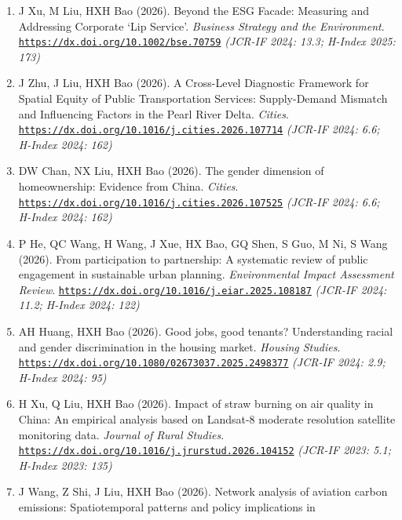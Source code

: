 \documentclass[10pt,a4paper]{article}
\providecommand{\tightlist}{%
  \setlength{\itemsep}{2pt}\setlength{\parskip}{0pt}}
\begin{document}
\begin{enumerate}
\def\labelenumi{\arabic{enumi}.}
\tightlist
\item
  J Xu, M Liu, HXH Bao (2026). Beyond the ESG Facade: Measuring and
  Addressing Corporate `Lip Service'. \emph{Business Strategy and the
  Environment}.
  \href{https://dx.doi.org/10.1002/bse.70759}{\nolinkurl{https://dx.doi.org/10.1002/bse.70759}}
  \emph{(JCR-IF 2024: 13.3; H-Index 2025: 173)}
\item
  J Zhu, J Liu, HXH Bao (2026). A Cross-Level Diagnostic Framework for
  Spatial Equity of Public Transportation Services: Supply-Demand
  Mismatch and Influencing Factors in the Pearl River Delta.
  \emph{Cities}.
  \href{https://dx.doi.org/10.1016/j.cities.2026.107714}{\nolinkurl{https://dx.doi.org/10.1016/j.cities.2026.107714}}
  \emph{(JCR-IF 2024: 6.6; H-Index 2024: 162)}
\item
  DW Chan, NX Liu, HXH Bao (2026). The gender dimension of
  homeownership: Evidence from China. \emph{Cities}.
  \href{https://dx.doi.org/10.1016/j.cities.2026.107525}{\nolinkurl{https://dx.doi.org/10.1016/j.cities.2026.107525}}
  \emph{(JCR-IF 2024: 6.6; H-Index 2024: 162)}
\item
  P He, QC Wang, H Wang, J Xue, HX Bao, GQ Shen, S Guo, M Ni, S Wang
  (2026). From participation to partnership: A systematic review of
  public engagement in sustainable urban planning. \emph{Environmental
  Impact Assessment Review}.
  \href{https://dx.doi.org/10.1016/j.eiar.2025.108187}{\nolinkurl{https://dx.doi.org/10.1016/j.eiar.2025.108187}}
  \emph{(JCR-IF 2024: 11.2; H-Index 2024: 122)}
\item
  AH Huang, HXH Bao (2026). Good jobs, good tenants? Understanding
  racial and gender discrimination in the housing market. \emph{Housing
  Studies}.
  \href{https://dx.doi.org/10.1080/02673037.2025.2498377}{\nolinkurl{https://dx.doi.org/10.1080/02673037.2025.2498377}}
  \emph{(JCR-IF 2024: 2.9; H-Index 2024: 95)}
\item
  H Xu, Q Liu, HXH Bao (2026). Impact of straw burning on air quality in
  China: An empirical analysis based on Landsat-8 moderate resolution
  satellite monitoring data. \emph{Journal of Rural Studies}.
  \href{https://dx.doi.org/10.1016/j.jrurstud.2026.104152}{\nolinkurl{https://dx.doi.org/10.1016/j.jrurstud.2026.104152}}
  \emph{(JCR-IF 2023: 5.1; H-Index 2023: 135)}
\item
  J Wang, Z Shi, J Liu, HXH Bao (2026). Network analysis of aviation
  carbon emissions: Spatiotemporal patterns and policy implications in

\end{enumerate}
\end{document}
